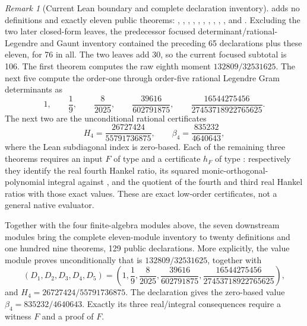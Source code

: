 \documentclass[11pt,oneside]{article}
\theoremstyle{definition}
\theoremstyle{remark}
\newtheorem{remark}[theorem]{Remark}
\numberwithin{equation}{section}
\begin{document}
\begin{remark}[Current Lean boundary and complete declaration inventory]
 adds no definitions and exactly eleven
public theorems:
,
,
,
,
,
,
,
,
,
, and
.
Excluding the two later closed-form leaves, the predecessor focused
determinant/rational-Legendre and Gaunt inventory contained the preceding 65
declarations plus these eleven, for 76 in all.  The two leaves add 30, so the
current focused subtotal is 106.  The first
theorem computes the raw eighth moment \(132809/32531625\).  The next five
compute the order-one through order-five rational Legendre Gram determinants as
\[
 1,\qquad \frac19,\qquad \frac8{2025},\qquad
 \frac{39616}{602791875},\qquad
 \frac{16544275456}{27453718922765625}.
\]
The next two are the unconditional rational certificates
\[
 H_4=\frac{26727424}{55791736875},
 \qquad
 \beta_4=\frac{835232}{4640643},
\]
where the Lean subdiagonal index is zero-based.  Each of the remaining three
theorems requires an input \(F\) of type  and a certificate
\(h_F\) of type : respectively they identify the real fourth
Hankel ratio, its squared monic-orthogonal-polynomial integral against
, and the quotient of the fourth and third real Hankel
ratios with those exact values.  These are exact low-order certificates, not a
general native evaluator.

Together with the four finite-algebra modules above, the seven downstream modules bring
the complete eleven-module inventory to twenty definitions and one hundred nine
theorems, 129 public declarations.  More explicitly, the value module proves
unconditionally that
 is \(132809/32531625\), together with
\[
 (D_1,D_2,D_3,D_4,D_5)=
 \left(1,\frac19,\frac8{2025},\frac{39616}{602791875},
 \frac{16544275456}{27453718922765625}\right),
\]
and \(H_4=26727424/55791736875\).  The declaration
 gives the zero-based value
\(\beta_4=835232/4640643\).
Exactly its three real/integral consequences require a
 witness \(F\) and a proof of  \(F\).


\end{remark}
\end{document}
